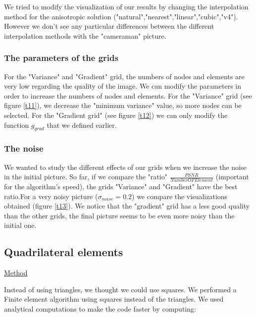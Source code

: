 \documentclass{report}
\begin{document}
We tried to modify the visualization of our results by changing the interpolation method for the anisotropic solution ("natural","nearest","linear","cubic","v4"). However we don't see any particular differences between the different interpolation methods with the "cameraman" picture. 




\subsubsection{The parameters of the grids}

For the "Variance" and "Gradient" grid, the numbers of nodes and elements are very low regarding the quality of the image. We can modify the parameters in order to increase the numbers of nodes and elements. 
For the "Variance" grid (see figure \ref{t11}), we decrease the "minimum variance" value, so more nodes can be selected. For the "Gradient grid" (see figure \ref{t12}) we can only modify the function $g_{grad}$ that we defined earlier. 






\subsubsection{The noise}


We wanted to study the different effects of our grids when we increase the noise in the initial picture. So far, if we compare the "ratio" $\frac{PSNR}{NumberOFElement}$ (important for the algorithm's speed), the grids "Variance" and "Gradient" have the best ratio.For a very noisy picture ($\sigma_{noise}=0.2$) we compare the visualizations obtained (figure \ref{t13}). We notice that the "gradient" grid has a less good quality than the other grids, the final picture seems to be even more noisy than the initial one.  







\subsection{Quadrilateral elements}

\underline{Method}

Instead of using triangles, we thought we could use squares. We performed a Finite element algorithm using squares instead of the triangles. We used analytical computations to make the code faster by computing: 
\end{document}
